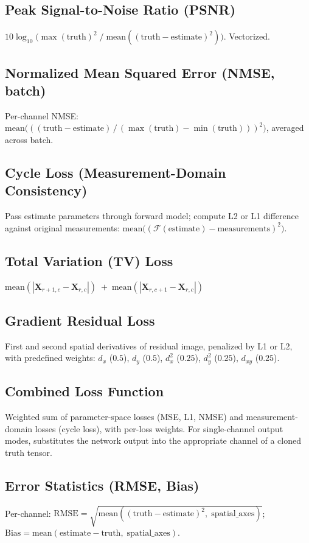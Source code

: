 \documentclass[11pt,a4paper]{article}
\begin{document}
\subsection{Peak Signal-to-Noise Ratio (PSNR)}
$10 \log_{10}\!\big(\max(\text{truth})^2 \;/\; \text{mean}((\text{truth} - \text{estimate})^2)\big)$. Vectorized.

\subsection{Normalized Mean Squared Error (NMSE, batch)}
Per-channel NMSE: $\text{mean}\big(((\text{truth} - \text{estimate})\,/\,(\max(\text{truth}) - \min(\text{truth})))^2\big)$, averaged across batch.

\subsection{Cycle Loss (Measurement-Domain Consistency)}
Pass estimate parameters through forward model; compute L2 or L1 difference against original measurements: $\text{mean}\big((\mathcal{F}(\text{estimate}) - \text{measurements})^{2}\big)$.

\subsection{Total Variation (TV) Loss}
$\text{mean}(|\mathbf{X}_{r+1,c} - \mathbf{X}_{r,c}|) \;+\; \text{mean}(|\mathbf{X}_{r,c+1} - \mathbf{X}_{r,c}|)$

\subsection{Gradient Residual Loss}
First and second spatial derivatives of residual image, penalized by L1 or L2, with predefined weights: $d_x$ ($0.5$), $d_y$ ($0.5$), $d^2_x$ ($0.25$), $d^2_y$ ($0.25$), $d_{xy}$ ($0.25$).

\subsection{Combined Loss Function}
Weighted sum of parameter-space losses (MSE, L1, NMSE) and measurement-domain losses (cycle loss), with per-loss weights. For single-channel output modes, substitutes the network output into the appropriate channel of a cloned truth tensor.

\subsection{Error Statistics (RMSE, Bias)}
Per-channel: $\text{RMSE} = \sqrt{\text{mean}((\text{truth} - \text{estimate})^2,\; \text{spatial\_axes})}$; $\text{Bias} = \text{mean}(\text{estimate} - \text{truth},\; \text{spatial\_axes})$.
\end{document}
